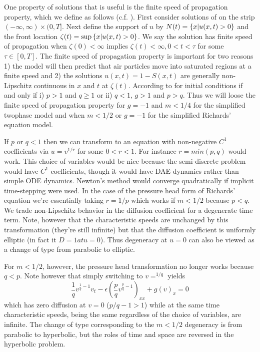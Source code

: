 \documentclass[10pt,dvips,twoside,reqno]{amsart}
\begin{document}
 One property of 
solutions that is useful is the finite speed of propagation property,
which we define as follows (c.f. \cite{Gilding_Kersner_97}).  First consider
solutions of  on the strip $(-\infty,\infty) \times
(0,T]$.  Next define the support of $u$ by $N(t) = \left\{ x | u(x,t) > 0
\right\}$ and the front location $\zeta(t) = \sup \left\{ x | u(x,t) > 0
\right\}$.  We say the solution has finite speed of propagation when
$\zeta(0) < \infty$ implies $\zeta(t) < \infty, 0 < t < \tau$ for some
$\tau \in [0,T]$. The finite speed of propagation property is
important for two reasons 1) the model will then predict that air
particles move into saturated regions at a finite speed and 2) the
solutions $u(x,t) = 1 - S(x,t)$ are generally non-Lipschitz continuous
in $x$ and $t$ at $\zeta(t)$.  According to \cite{King} 
for initial conditions if and only if i) $p > 1$ and $q \geq 1$ or ii)
$q < 1$, $g>1$ and $p > q$.  Thus we will loose the finite speed of
propagation property for $g = -1$ and $m < 1/4$ for the simplified
twophase model and when $m < 1/2$ or $g=-1$ for the simplified
Richards' equation model.
  
 If $p$ or $q < 1$ then we
can transform  to an equation with non-negative $C^1$
coefficients via $u=v^{1/r}$ for some $0<r<1$. For instance
$r=min(p,q)$ would work. This choice of variables would be nice
because the semi-discrete problem would have $C^1$ coefficients,
though it would have DAE dynamics rather than simple ODE dynamics.
Newton's method would converge quadratically if implicit time-stepping
were used. In the case of the pressure head form of Richards' equation
we're essentially taking $r=1/p$ which works if $m<1/2$ because $p<q$.
We trade non-Lipschitz behavior in the diffusion coefficient for a
degenerate time term. Note, however that the characteristic speeds are
unchanged by this transformation (they're still infinite) but that the
diffusion coefficient is uniformly elliptic (in fact it $D=1 at u=0$).
Thus degeneracy at $u=0$ can also be viewed as a change of type from
parabolic to elliptic.

For $m < 1/2$, however, the pressure head transformation no longer
works because $q<p$. Note however that simply switching to $v=^{1/q}$
yields
\begin{equation}
  \label{eq:simpMod}
  \frac{1}{q}v^{\frac{1}{q}-1} v_t - \epsilon (\frac{p}{q} v^{\frac{p}{q} - 1})_{xx} + g (v)_{x} = 0
\end{equation}
which has zero diffusion at $v=0$ ($p/q - 1 > 1$) while at the same
time characteristic speeds, being the same regardless of the choice of
variables, are infinite. The change of type corresponding to the
$m<1/2$ degeneracy is from parabolic to hyperbolic, but the roles of
time and space are reversed in the hyperbolic problem. 
\end{document}
